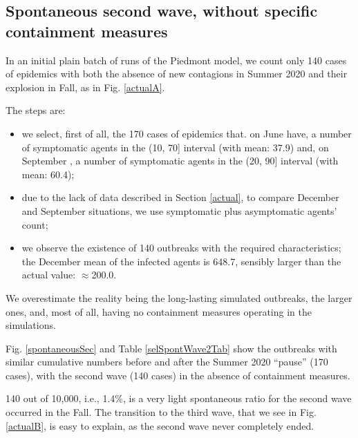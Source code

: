 \documentclass[graybox]{svmult}
\begin{document}
\subsection{Spontaneous second wave, without specific containment measures}
\label{spont}

In an initial plain batch of runs of the Piedmont model, we count only 140 cases of epidemics with both the absence of new contagions in Summer 2020 and their explosion in Fall, as in Fig. \ref{actualA}.

The steps are:
\begin{itemize}

\item we select, first of all, the 170 cases of epidemics that. on June  have, a number of symptomatic agents in the (10, 70] interval (with mean: 37.9) and, on September , a number of symptomatic agents in the (20, 90] interval (with mean: 60.4);

\item due to the lack of data described in Section \ref{actual}, to compare December  and September  situations, we use symptomatic plus asymptomatic agents' count;

\item we observe the existence of 140 outbreaks with the required characteristics; the December mean of the infected agents is 648.7, sensibly larger than the actual value: $\approx$200.0. 

\end{itemize}


We overestimate the reality being the long-lasting simulated outbreaks, the larger ones, and, most of all, having no containment measures operating in the simulations.

Fig. \ref{spontaneousSec} and Table \ref{selSpontWave2Tab} show the outbreaks with similar cumulative numbers before and after the Summer 2020 ``pause'' (170 cases), with the second wave (140 cases) in the absence of containment measures.

140 out of 10,000, i.e., 1.4\%, is a very light spontaneous ratio for the second wave occurred in the Fall. The transition to the third wave, that we see in Fig. \ref{actualB}, is easy to explain, as the second wave never completely ended.
\end{document}
